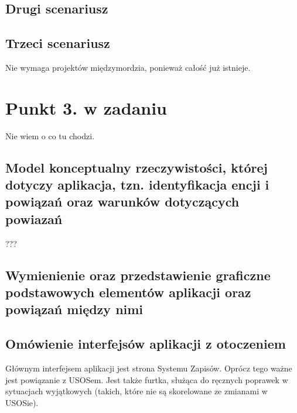 \documentclass{article}
\begin{document}

\subsection{Drugi scenariusz}

\subsection{Trzeci scenariusz}
Nie wymaga projektów międzymordzia, %
ponieważ całość już istnieje.



\section{Punkt 3. w zadaniu}
Nie wiem o co tu chodzi. %

\subsection{Model konceptualny rzeczywistości, której dotyczy aplikacja, tzn. identyfikacja encji i powiązań oraz warunków dotyczących powiazań}
??? %

\subsection{Wymienienie oraz przedstawienie graficzne podstawowych elementów aplikacji oraz
powiązań między nimi}

\subsection{Omówienie interfejsów aplikacji z otoczeniem}
Głównym interfejsem aplikacji jest strona Systemu Zapisów. Oprócz tego ważne jest powiązanie z USOSem. Jest także furtka, służąca do ręcznych poprawek w sytuacjach wyjątkowych (takich, które nie są skorelowane ze zmianami w USOSie).



\afterpage{\null\newpage}
\newpage
\end{document}
